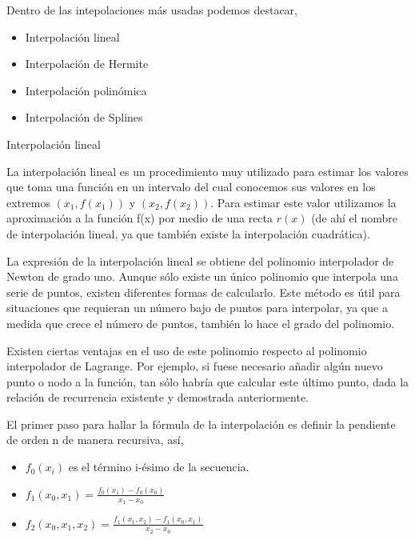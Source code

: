 \hspace{0.4cm} Dentro de las intepolaciones m\'as usadas podemos destacar,

\begin{itemize}
  \item Interpolaci\'on lineal
  \item Interpolaci\'on de Hermite
  \item Interpolaci\'on polin\'omica 
  \item Interpolaci\'on de Splines 

\end{itemize}

Interpolaci\'on lineal

\hspace{0.4cm} La interpolaci\'on lineal es un procedimiento muy utilizado para estimar los valores que toma una funci\'on en un intervalo del cual conocemos sus valores en los extremos $(x_{1}, f(x_{1}))$ y $(x_{2},f(x_{2}))$. Para estimar este valor utilizamos la aproximaci\'on a la funci\'on f(x) por medio de una recta $r(x)$ (de ah\'i el nombre de interpolaci\'on lineal, ya que tambi\'en existe la interpolaci\'on cuadr\'atica). 


\hspace{0.4cm} La expresi\'on de la interpolaci\'on lineal se obtiene del polinomio interpolador de Newton de grado uno. Aunque s\'olo existe un \'unico polinomio que interpola una serie de puntos, existen diferentes formas de calcularlo. Este m\'etodo es \'util para situaciones que requieran un n\'umero bajo de puntos para interpolar, ya que a medida que crece el n\'umero de puntos, tambi\'en lo hace el grado del polinomio.

\hspace{0.4cm} Existen ciertas ventajas en el uso de este polinomio respecto al polinomio interpolador de Lagrange. Por ejemplo, si fuese necesario a\~nadir alg\'un nuevo punto o nodo a la funci\'on, tan s\'olo habr\'ia que calcular este \'ultimo punto, dada la relaci\'on de recurrencia existente y demostrada anteriormente.

\hspace{0.4cm}El primer paso para hallar la f\'ormula de la interpolaci\'on es definir la pendiente de orden n de manera recursiva, as\'i,

\begin{itemize}
  \item $f_{0}(x_{i})$ es el t\'ermino i-\'esimo de la secuencia. 
  \item $\displaystyle{f_{1}(x_{0},x_{1}) = \frac{f_{0}(x_{1})-f_{0}(x_{0})}{x_{1}-x_{0}}}$
  \item $\displaystyle{f_{2}(x_{0},x_{1},x_{2}) = \frac{f_{1}(x_{1},x_{2})-f_{1}(x_{0},x_{1})}{x_{2}-x_{0}}}$
\end{itemize}

